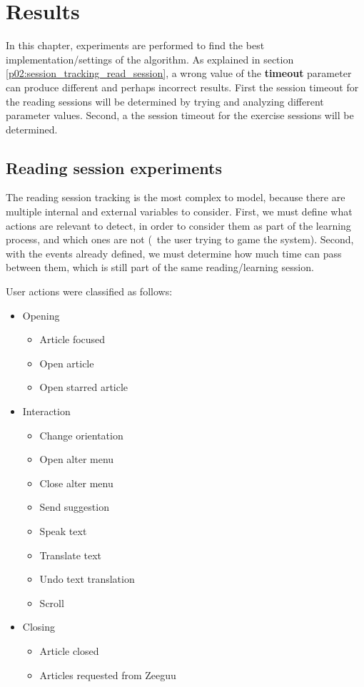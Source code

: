\chapter{Results}\label{p03:results}
In this chapter, experiments are performed to find the best implementation/settings of the algorithm. As explained in section \ref{p02:session_tracking_read_session}, a wrong value of the \textbf{timeout} parameter can produce different and perhaps incorrect results.
First the session timeout for the reading sessions will be determined by trying and analyzing different parameter values. Second, a the session timeout for the exercise sessions will be determined.

\section{Reading session experiments}
The reading session tracking is the most complex to model, because there are multiple internal and external variables to consider. First, we must define what actions are relevant to detect, in order to consider them as part of the learning process, and which ones are not (\Ie\ the user trying to game the system). Second, with the events already defined, we must determine how much time can pass between them, which is still part of the same reading/learning session.

User actions were classified as follows:
\begin{itemize}
	\item Opening
		\begin{itemize}
			\item Article focused
			\item Open article
			\item Open starred article
		\end{itemize}
	
	\item Interaction
		\begin{itemize}
			\item Change orientation
			\item Open alter menu
			\item Close alter menu
			\item Send suggestion
			\item Speak text
			\item Translate text
			\item Undo text translation
			\item Scroll
		\end{itemize}
	
	\item Closing
		\begin{itemize}
			\item Article closed
			\item Articles requested from Zeeguu
		\end{itemize}
\end{itemize}


